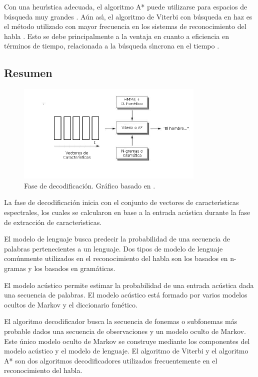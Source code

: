 Con una heur{\'\i}stica adecuada, el algoritmo A* puede utilizarse para espacios de b\'usqueda 
muy grandes \cite{huang-handbook10}.
A\'un as{\'\i}, el algoritmo de Viterbi con b\'usqueda en haz es el m\'etodo utilizado con mayor frecuencia
en los sistemas de reconocimiento del habla \cite{huang-handbook10}. 
Esto se debe principalmente a la ventaja en cuanto a eficiencia en t\'erminos de tiempo, 
relacionada a la b\'usqueda s{\'\i}ncrona en el tiempo \cite{huang-handbook10}.


\subsection{Resumen}

\begin{figure}[H] 
\centering
\includegraphics[width=0.8\textwidth]{./graphics/decodificacion.png}
\caption{Fase de decodificaci\'on. Gr\'afico basado en \cite{VerenichASR}.}
\label{figure:decoding}
\end{figure}

La fase de decodificaci\'on inicia con el conjunto de vectores de caracter{\'\i}sticas espectrales,
los cuales se calcularon en base a la entrada ac\'ustica durante la fase de extracci\'on de caracter{\'\i}sticas.

El modelo de lenguaje busca predecir la probabilidad de una secuencia de palabras pertenecientes a un lenguaje.
Dos tipos de modelo de lenguaje com\'unmente utilizados en el reconocimiento del habla son los basados en
n-gramas y los basados en gram\'aticas.

El modelo ac\'ustico permite estimar la probabilidad de una entrada ac\'ustica dada una secuencia de palabras.
El modelo ac\'ustico est\'a formado por varios modelos ocultos de Markov y el diccionario fon\'etico.

El algoritmo decodificador busca la secuencia de fonemas o subfonemas m\'as probable dados una 
secuencia de observaciones y un modelo oculto de Markov. Este \'unico modelo oculto de Markov se construye
mediante los componentes del modelo ac\'ustico y el modelo de lenguaje. El algoritmo de Viterbi y el 
algoritmo A* son dos algoritmos decodificadores utilizados frecuentemente en el reconocimiento del habla.

